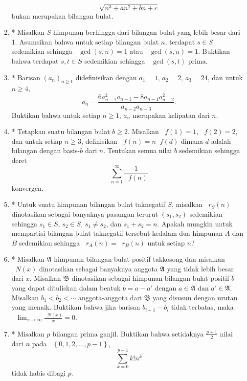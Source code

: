 \documentclass[12pt]{article}
\newcommand*\lrbr[1]{\mathop{}\!\left\lbrace#1\right\rbrace}
\newcommand*\func[2]{\mathop{}\!{#1}{\left({#2}\right)}}
\newcommand*\ds[1]{\mathop{}\!\displaystyle{{#1}}}
\begin{document}
\begin{enumerate}[leftmargin=*]
		\[ \sqrt{n^{3} + an^{2} + bn + c} \]
		bukan merupakan bilangan bulat.
		\item* Misalkan $ S $ himpunan berhingga dari bilangan bulat yang lebih besar dari 1. Asumsikan bahwa untuk setiap bilangan bulat $ n $, terdapat $ s \in S $ sedemikian sehingga $ \func{\gcd}{s, n} = 1 $ atau $ \func{\gcd}{s, n} = 1 $. Buktikan bahwa terdapat $ s, t \in S $ sedemikian sehingga $ \func{\gcd}{s, t} $ prima.
		\item* Barisan $ \left(a_{n}\right)_{n \geq 1} $ didefinisikan dengan $ a_{1} = 1 $, $ a_{2} = 2 $, $ a_{3} = 24 $, dan untuk $ n \geq 4 $,
		\[ a_{n} = \frac{6a_{n - 1}^{2}a_{n - 3} - 8a_{n - 1}a_{n - 2}^{2}}{a_{n - 2}a_{n - 3}}. \]
		Buktikan bahwa untuk setiap $ n \geq 1 $, $ a_{n} $ merupakan kelipatan dari $ n $.
		\item* Tetapkan suatu bilangan bulat $ b \geq 2 $. Misalkan $ \func{f}{1} = 1 $, $ \func{f}{2} = 2 $, dan untuk setiap $ n \geq 3 $, definisikan $ \func{f}{n} = n\func{f}{d} $ dimana $ d $ adalah bilangan dengan basis-$ b $ dari $ n $. Tentukan semua nilai $ b $ sedemikian sehingga deret
		\[ \sum_{n = 1}^{\infty}{\frac{1}{\func{f}{n}}} \]
		konvergen.
		\item* Untuk suatu himpunan bilangan bulat taknegatif $ S $, misalkan $ \func{r_{S}}{n} $ dinotasikan sebagai banyaknya pasangan terurut $ \left(s_{1}, s_{2}\right) $ sedemikian sehingga $ s_{1} \in S $, $ s_{2} \in S $, $ s_{1} \ne s_{2} $, dan $ s_{1} + s_{2} = n $. Apakah mungkin untuk mempartisi bilangan bulat taknegatif tersebut kedalam dua himpunan $ A $ dan $ B $ sedemikian sehingga $ \func{r_{A}}{n} = \func{r_{B}}{n} $ untuk setiap $ n $?
		\item* Misalkan $ \mathfrak{A} $ himpunan bilangan bulat positif takkosong dan misalkan $ \func{N}{x} $ dinotasikan sebagai banyaknya anggota $ \mathfrak{A} $ yang tidak lebih besar dari $ x $. Misalkan $ \mathfrak{B} $ dinotasikan sebagai himpunan bilangan bulat positif $ b $ yang dapat dituliskan dalam bentuk $ b = a - a' $ dengan $ a \in \mathfrak{A} $ dan $ a' \in \mathfrak{A} $. Misalkan $ b_{1} < b_{2} < \cdots $ anggota-anggota dari $ \mathfrak{B} $ yang disusun dengan urutan yang menaik. Buktikan bahwa jika barisan $ b_{i + 1} - b_{i} $ tidak terbatas, maka $ \ds{\lim_{x \to \infty}{\frac{\func{N}{x}}{x}}} = 0. $
		\item* Misalkan $ p $ bilangan prima ganjil. Buktikan bahwa setidaknya $ \frac{p + 1}{2} $ nilai dari $ n $ pada $ \lrbr{0, 1, 2, \dots, p - 1} $,
		\[ \sum_{k = 0}^{p - 1}{k!n^{k}} \]
		tidak habis dibagi $ p $.

\end{enumerate}
\end{document}
